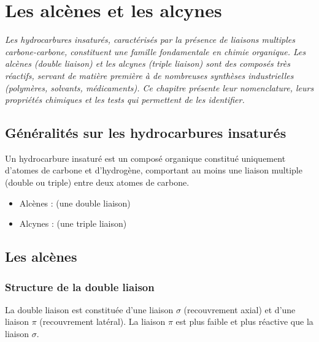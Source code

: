 \chapter{Les alcènes et les alcynes}

\textit{Les hydrocarbures insaturés, caractérisés par la présence de liaisons multiples carbone-carbone, constituent une famille fondamentale en chimie organique. Les alcènes (double liaison) et les alcynes (triple liaison) sont des composés très réactifs, servant de matière première à de nombreuses synthèses industrielles (polymères, solvants, médicaments). Ce chapitre présente leur nomenclature, leurs propriétés chimiques et les tests qui permettent de les identifier.}

\section{Généralités sur les hydrocarbures insaturés}

\begin{definition}
Un hydrocarbure insaturé est un composé organique constitué uniquement d'atomes de carbone et d'hydrogène, comportant au moins une liaison multiple (double ou triple) entre deux atomes de carbone.
\end{definition}

\begin{propriete}
\begin{itemize}
    \item Alcènes :  (une double liaison)
    \item Alcynes :  (une triple liaison)
\end{itemize}
\end{propriete}

\section{Les alcènes}

\subsection{Structure de la double liaison}

\begin{definition}
La double liaison  est constituée d'une liaison $\sigma$ (recouvrement axial) et d'une liaison $\pi$ (recouvrement latéral). La liaison $\pi$ est plus faible et plus réactive que la liaison $\sigma$.
\end{definition}

